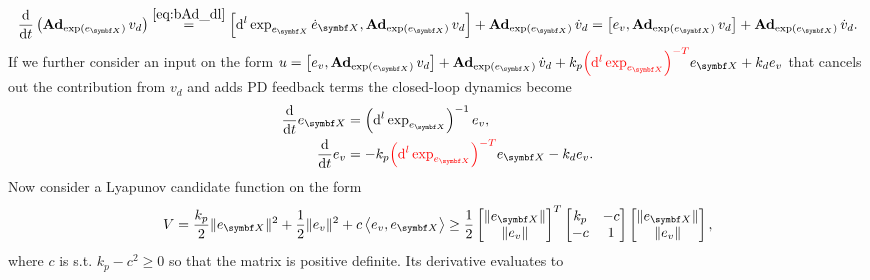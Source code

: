 \begin{equation}
  \frac{\mathrm{d}}{\mathrm{d}t} \left( \bAd_{\exp(e_\X)} v_d\right) \overset{\eqref{eq:bAd_dl}}= \left[ \mathrm{d}^l \exp_{e_\X} \dot e_\X,  \bAd_{\exp(e_\X)} v_d \right] + \bAd_{\exp(e_\X)} \dot v_d = \left[ e_v,  \bAd_{\exp(e_\X)} v_d \right] + \bAd_{\exp(e_\X)} \dot v_d.
\end{equation}
If we further consider an input on the form $u = \left[ e_v,  \bAd_{\exp(e_\X)} v_d \right] + \bAd_{\exp(e_\X)} \dot v_d + k_p \textcolor{red}{\left( \mathrm{d}^l \exp_{e_\X} \right)^{-T}} e_\X + k_d e_v$ that cancels out the contribution from $v_d$ and adds PD feedback terms the closed-loop dynamics become
\begin{equation}
  \begin{aligned}
    \frac{\mathrm{d}}{\mathrm{d}t} e_\X &= \left(\mathrm{d}^l \exp_{e_\X} \right)^{-1} e_v,\\
    \frac{\mathrm{d}}{\mathrm{d}t} e_v &= -k_p \textcolor{red}{\left( \mathrm{d}^l \exp_{e_\X} \right)^{-T}} e_\X - k_d e_v.
  \end{aligned}
\end{equation}
Now consider a Lyapunov candidate function on the form
\begin{equation}
  V = \frac{k_p}{2} \| e_\X \|^2 + \frac{1}{2} \| e_v \|^2 + c \left \langle e_v, e_\X \right \rangle \geq \frac{1}{2} \begin{bmatrix} \| e_\X \| \\ \| e_v \| \end{bmatrix}^T \begin{bmatrix} k_p & -c \\ -c & 1 \end{bmatrix} \begin{bmatrix} \| e_\X \| \\ \| e_v \| \end{bmatrix},
\end{equation}
where $c$ is s.t. $k_p - c^2 \geq 0$ so that the matrix is positive definite. Its derivative evaluates to
